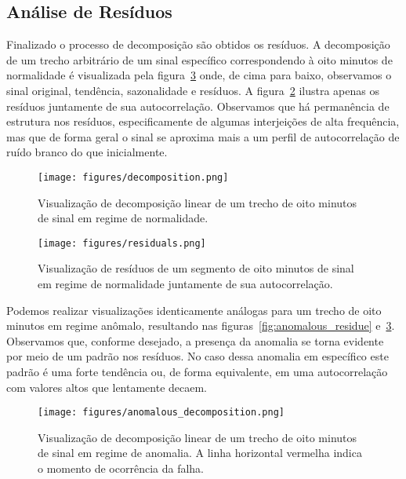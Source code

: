 \subsection{Análise de Resíduos}

Finalizado o processo de decomposição são obtidos os resíduos. A decomposição
de um trecho arbitrário de um sinal específico correspondendo à oito minutos de
normalidade é visualizada pela figura~\ref{fig:decomposition} onde, de cima
para baixo, observamos o sinal original, tendência, sazonalidade e resíduos. A
figura~\ref{fig:normal_residue} ilustra apenas os resíduos juntamente de sua
autocorrelação. Observamos que há permanência de estrutura nos resíduos,
especificamente de algumas interjeições de alta frequência, mas que de forma
geral o sinal se aproxima mais a um perfil de autocorrelação de ruído branco
do que inicialmente.

\begin{figure}[H]
    \centering
    \texttt{[image: figures/decomposition.png]}
    \caption{Visualização de decomposição linear de um trecho de oito
    minutos de sinal em regime de normalidade.}
    \label{fig:decomposition}
\end{figure}

\begin{figure}[H]
    \centering
    \texttt{[image: figures/residuals.png]}
    \caption{Visualização de resíduos de um segmento de oito minutos de sinal
    em regime de normalidade juntamente de sua autocorrelação.}
    \label{fig:normal_residue}
\end{figure}

Podemos realizar visualizações identicamente análogas para um trecho de oito
minutos em regime anômalo, resultando nas figuras~\ref{fig:anomalous_residue}
e~\ref{fig:decomposition}. Observamos que, conforme desejado, a presença da
anomalia se torna evidente por meio de um padrão nos resíduos. No caso dessa
anomalia em específico este padrão é uma forte tendência ou, de forma
equivalente, em uma autocorrelação com valores altos que lentamente decaem.

\begin{figure}[H]
    \centering
    \texttt{[image: figures/anomalous\_decomposition.png]}
    \caption{Visualização de decomposição linear de um trecho de oito
    minutos de sinal em regime de anomalia. A linha horizontal vermelha
    indica o momento de ocorrência da falha.}
    \label{fig:decomposition}
\end{figure}

